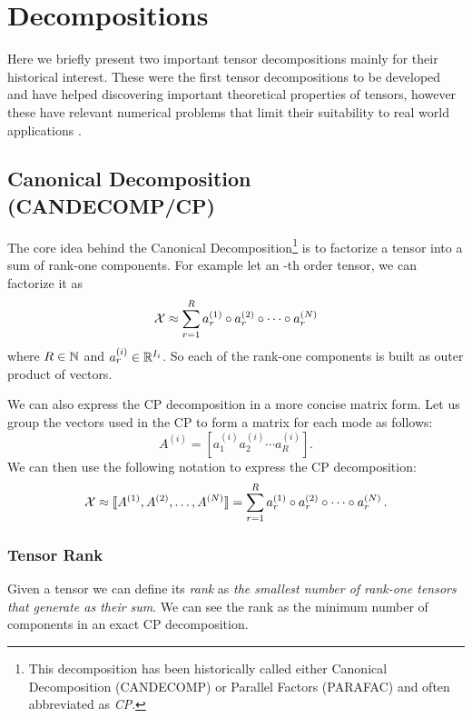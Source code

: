 \chapter{Decompositions}
Here we briefly present two important tensor decompositions mainly for their historical interest. These were the first tensor decompositions to be developed and have helped discovering important theoretical properties of tensors, however these have relevant numerical problems that limit their suitability to real world applications \cite{tensorreview}.

\section{Canonical Decomposition (CANDECOMP/CP)}
The core idea behind the Canonical Decomposition\footnote{This decomposition has been historically called either Canonical Decomposition (CANDECOMP) or Parallel Factors (PARAFAC) and often abbreviated as \emph{CP}.} is to factorize a tensor into a sum of rank-one components. For example let \X an \N-th order tensor, we can factorize it as
\begin{equation*}
  \mathcal{X} \approx \sum_{r = 1}^R a_r^{(1)} \circ a_r^{(2)} \circ \cdots \circ a_r^{(N)}
\end{equation*}
where $R \in \mathbb{N}$ and $a_r^{(i)} \in \mathbb{R}^{I_i}$. So each of the rank-one components is built as outer product of \N vectors.

We can also express the CP decomposition in a more concise matrix form.
Let us group the vectors used in the CP to form a matrix for each mode  as follows:
\begin{equation*}
  A^{(i)} = [ a^{(i)}_1 a^{(i)}_2 \cdots a^{(i)}_R ].
\end{equation*}
We can then use the following notation to express the CP decomposition:
\begin{equation*}
  \mathcal{X} \approx \llbracket A^{(1)}, A^{(2)}, \ldots, A^{(N)} \rrbracket = \sum_{r = 1}^R a_r^{(1)} \circ a_r^{(2)} \circ \cdots \circ a_r^{(N)}\, .
\end{equation*}

\subsection{Tensor Rank}
Given a tensor \X we can define its \emph{rank} as \emph{the smallest number of rank-one tensors that generate \X as their sum}. We can see the rank as the minimum number of components in an exact CP decomposition.

